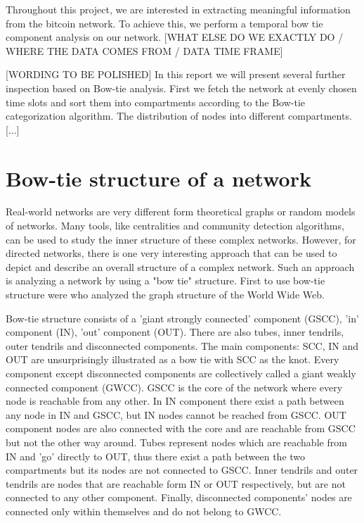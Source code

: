 \documentclass{Resources/netsci-project}
\begin{document}
Throughout this project, we are interested in extracting meaningful information from the bitcoin network. To achieve this, we perform a temporal bow tie component analysis on our network. [WHAT ELSE DO WE EXACTLY DO / WHERE THE DATA COMES FROM / DATA TIME FRAME]

[WORDING TO BE POLISHED] In this report we will present several further inspection based on Bow-tie analysis. First we fetch the network at evenly chosen time slots and sort them into compartments according to the Bow-tie categorization algorithm. The distribution of nodes into different compartments. [...]

\section{Bow-tie structure of a network}

Real-world networks are very different form theoretical graphs or random models of networks. Many tools, like centralities and community detection algorithms, can be used to study the inner structure of these complex networks. However, for directed networks, there is one very interesting approach that can be used to depict and describe an overall structure of a complex network. Such an approach is analyzing a network by using a "bow tie" structure. First to use bow-tie structure were \textcite{Broder2000} who analyzed the graph structure of the World Wide Web.

Bow-tie structure consists of a 'giant strongly connected' component (GSCC), 'in' component (IN), 'out' component (OUT). There are also tubes, inner tendrils, outer tendrils and disconnected components. The main components: SCC, IN and OUT are unsurprisingly illustrated as a bow tie with SCC as the knot. Every component except disconnected components are collectively called a giant weakly connected component (GWCC). GSCC is the core of the network where every node is reachable from any other. In IN component there exist a path between any node in IN and GSCC, but IN nodes cannot be reached from GSCC. OUT component nodes are also connected with the core and are reachable from GSCC but not the other way around. Tubes represent nodes which are reachable from IN and 'go' directly to OUT, thus there exist a path between the two compartments but its nodes are not connected to GSCC. Inner tendrils and outer tendrils are nodes that are reachable form IN or OUT respectively, but are not connected to any other component. Finally, disconnected components' nodes are connected only within themselves and do not belong to GWCC. 
\end{document}
